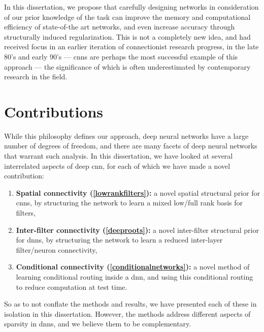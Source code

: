 \documentclass[thesis]{subfiles}
\begin{document}
In this dissertation, we propose that carefully designing networks in consideration of our prior knowledge of the task can improve the memory and computational efficiency of state-of-the art networks, and even increase accuracy through structurally induced regularization. This is not a completely new idea, and had received focus in an earlier iteration of connectionist research progress, in the late 80's and early 90's --- \glspl{cnn} are perhaps the most successful example of this approach --- the significance of which is often underestimated by contemporary research in the field.

\section{Contributions}
While this philosophy defines our approach, deep neural networks have a large number of degrees of freedom, and there are many facets of deep neural networks that warrant such analysis. In this dissertation, we have looked at several interrelated aspects of deep \gls{cnn}, for each of which we have made a novel contribution:
\begin{enumerate}[label= (\textbf{\roman*})]
	\item \textbf{Spatial connectivity (\cref{lowrankfilters}):} a novel spatial structural prior for \glspl{cnn}, by structuring the network to learn a mixed low/full rank basis for filters,
	\item \textbf{Inter-filter connectivity (\cref{deeproots}):} a novel inter-filter structural prior for \glspl{dnn}, by structuring the network to learn a reduced inter-layer filter/neuron connectivity,
	\item \textbf{Conditional connectivity (\cref{conditionalnetworks}):} a novel method of learning conditional routing inside a \gls{dnn}, and using this conditional routing to reduce computation at test time.
\end{enumerate}

So as to not conflate the methods and results, we have presented each of these in isolation in this dissertation. However, the methods address different aspects of sparsity in \glspl{dnn}, and we believe them to be complementary.
\end{document}
